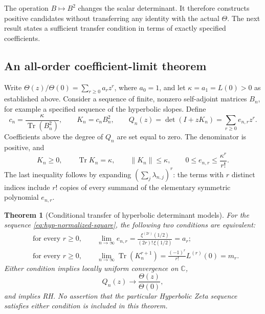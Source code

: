 \documentclass[11pt,a4paper]{article}
\numberwithin{equation}{section}
\newtheorem{theorem}{Theorem}[section]
\theoremstyle{definition}
\theoremstyle{remark}
\newcommand{\C}{\mathbb C}
\newcommand{\norm}[1]{\lVert #1\rVert}
\DeclareMathOperator{\Tr}{Tr}
\begin{document}
The operation $B\mapsto B^2$ changes the scalar determinant. It
therefore constructs positive candidates without transferring any
identity with the actual $\Theta$. The next result states a sufficient
transfer condition in terms of exactly specified coefficients.

\subsection{An all-order coefficient-limit theorem}
\label{subsec:hyp-limit}

Write $\Theta(z)/\Theta(0)=\sum_{r\geq0}a_rz^r$, where $a_0=1$,
and let $\kappa=a_1=L(0)>0$ as established above. Consider a sequence
of finite, nonzero self-adjoint matrices $B_n$, for example a
specified sequence of the hyperbolic slopes. Define
\begin{equation}\label{eq:hyp-normalized-square}
c_n=\frac{\kappa}{\Tr(B_n^2)},\qquad
K_n=c_nB_n^2,\qquad
Q_n(z)=\det(I+zK_n)=\sum_{r\geq0}e_{n,r}z^r.
\end{equation}
Coefficients above the degree of $Q_n$ are set equal to zero.
The denominator is positive, and
\begin{equation}\label{eq:hyp-trace-bound}
K_n\geq0,\qquad \Tr K_n=\kappa,\qquad
\norm{K_n}\leq\kappa,\qquad
0\leq e_{n,r}\leq\frac{\kappa^r}{r!}.
\end{equation}
The last inequality follows by expanding $(\sum_j\lambda_{n,j})^r$:
the terms with $r$ distinct indices include $r!$ copies of every
summand of the elementary symmetric polynomial $e_{n,r}$.

\begin{theorem}[Conditional transfer of hyperbolic determinant models]
\label{thm:hyp-coefficient-transfer}
For the sequence \eqref{eq:hyp-normalized-square}, the following two
conditions are equivalent:
\begin{align}
&\text{for every }r\geq0,\qquad
\lim_{n\to\infty}e_{n,r}
=\frac{\xi^{(2r)}(1/2)}{(2r)!\,\xi(1/2)}=a_r;
\label{eq:hyp-coefficient-target}\\
&\text{for every }r\geq0,\qquad
\lim_{n\to\infty}\Tr(K_n^{r+1})
=\frac{(-1)^r}{r!}L^{(r)}(0)=m_r.
\label{eq:hyp-power-target}
\end{align}
Either condition implies locally uniform convergence on $\C$,
\begin{equation}\label{eq:hyp-entire-limit}
Q_n(z)\longrightarrow\frac{\Theta(z)}{\Theta(0)},
\end{equation}
and implies RH. No assertion that the particular Hyperbolic Zeta
sequence satisfies either condition is included in this theorem.
\end{theorem}
\end{document}
